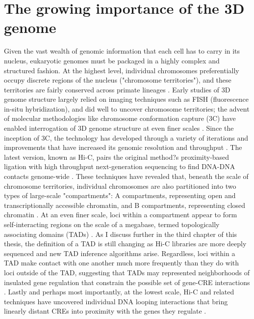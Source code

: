\section{The growing importance of the 3D genome}
Given the vast wealth of genomic information that each cell has to carry in its nucleus, eukaryotic genomes must be packaged in a highly complex and structured fashion. At the highest level, individual chromosomes preferentially occupy discrete regions of the nucleus ("chromosome territories"), and these territories are fairly conserved across primate lineages \cite{Meaburn.2007, Mora.2006, Tanabe.2002}. Early studies of 3D genome structure largely relied on imaging techniques such as FISH (fluorescence in-situ hybridization), and did well to uncover chromosome territories; the advent of molecular methodologies like chromosome conformation capture (3C) have enabled interrogation of 3D genome structure at even finer scales \cite{Dekker.2002}. Since the inception of 3C, the technology has developed through a variety of iterations and improvements that have increased its genomic resolution and throughput \cite{Fraser.2015}. The latest version, known as Hi-C, pairs the original method?s proximity-based ligation with high throughput next-generation sequencing to find DNA-DNA contacts genome-wide \cite{Lieberman-Aiden.2009}. These techniques have revealed that, beneath the scale of chromosome territories, individual chromosomes are also partitioned into two types of large-scale "compartments": A compartments, representing open and transcriptionally accessible chromatin, and B compartments, representing closed chromatin \cite{Lieberman-Aiden.2009, Naumova.2010}. At an even finer scale, loci within a compartment appear to form self-interacting regions on the scale of a megabase, termed topologically associating domains (TADs) \cite{Dixon.2012, Nora.2012, Hou.2012, Sexton.2012}. As I discuss further in the third chapter of this thesis, the definition of a TAD is still changing as Hi-C libraries are more deeply sequenced and new TAD inference algorithms arise. Regardless, loci within a TAD make contact with one another much more frequently than they do with loci outside of the TAD, suggesting that TADs may represented neighborhoods of insulated gene regulation that constrain the possible set of gene-CRE interactions \cite{Andrey.2017, Symmons.2014, Sexton.2015}. Lastly and perhaps most importantly, at the lowest scale, Hi-C and related techniques have uncovered individual DNA looping interactions that bring linearly distant CREs into proximity with the genes they regulate \cite{Rao.2014, Kadauke.2009}.

